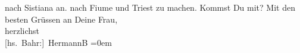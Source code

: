 \begin{ledgroupsized}[t]{13cm}
{{{                  nach Sistiana an.}}}\label{K_L01670_1h} nach Fiume und Triest zu machen.
               Kommst Du mit?\pend
           \pstart
           Mit den besten Grüssen an Deine Frau,{\\[\baselineskip]}herzlichst{\\[\baselineskip]}\spacefill\mbox{{[}hs. Bahr:{]} HermannB}\pend
           \leftskip=0em{}
         
         \endnumbering{}\end{ledgroupsized}  \newcommand{\dateiname}{L01670}\newcommand{\titel}{Hermann Bahr an Arthur Schnitzler, 26. 4. 1907}\newcommand{\editorInnen}{ Kurt Ifkovits,  Martin Anton Müller}
      